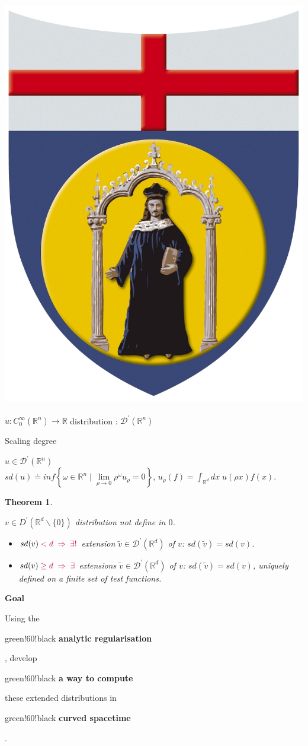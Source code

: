 \documentclass[a4paper,11pt]{beamer} %
\newcommand{\LogoUnivGenova}{\protect\includegraphics[scale=0.015]{fig_genova.JPG}} %
\newtheorem{thm}{Theorem}
\begin{document}
\begin{frame}
\frametitle{\LogoUnivGenova {} \cite{BF2000}}
\vspace{-2mm}
$u : C^{\infty}_{0}(\mathbb{R}^n) \to \mathbb{R}$ \; distribution : $\mathcal{D}^{\prime}(\mathbb{R}^n)$
\vspace{0mm}
\begin{block}{Scaling degree}
\begin{footnotesize}
$u \in \mathcal{D}^{\prime}(\mathbb{R}^n)$ \\
$sd(u) \doteq inf \left\{ \omega \in \mathbb{R}^n \; | \; \underset{\rho \to 0}{\lim} \rho^\omega u_\rho = 0 \right\}$, \; $u_\rho (f) = \int_{\mathbb{R}^d} dx \; u(\rho x) f(x)$.
\end{footnotesize}
\end{block}
\vspace{-2mm}
\begin{thm} 
\begin{footnotesize}
$v \in D^{\prime}(\mathbb{R}^d \backslash \{0\})$ \; distribution not define in $0$.\\
\begin{itemize}
\item $sd(v) \begin{color}{purple} < d \; \Rightarrow \; \exists! \end{color}$ extension $\tilde{v} \in \mathcal{D}^{\prime} (\mathbb{R}^d)$ of $v$: $sd(\tilde{v}) = sd(v)$. 
\item $sd(v) \begin{color}{purple} \geq d \; \Rightarrow \; \exists \end{color}$ extensions $\tilde{v} \in \mathcal{D}^{\prime} (\mathbb{R}^d)$ of $v$: $sd(\tilde{v}) = sd(v)$,
uniquely defined on a finite set of test functions.
\end{itemize}
\end{footnotesize}
\end{thm}
\vspace{-5mm}
\begin{block}{\bf \color{purple} Goal}
\begin{footnotesize}
Using the \begin{color}{green!60!black} \textbf{analytic regularisation} \end{color}, develop \begin{color}{green!60!black} \textbf{a way to compute} \end{color}these extended distributions in \begin{color}{green!60!black} \textbf{curved spacetime} \end{color}. \\

\end{footnotesize}
\end{block}
\end{frame}
\end{document}
